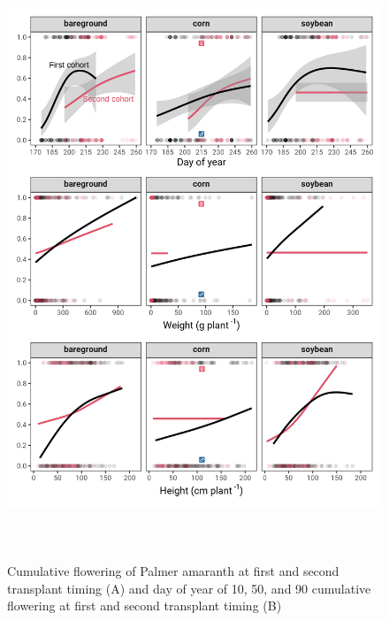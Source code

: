 \documentclass[utf8]{frontiersSCNS}
\begin{document}
\begin{figure}

{\centering \includegraphics[width=120mm,height=180mm]{../data analysis/figures/Figure 4} 

}

\caption{Cumulative flowering of Palmer amaranth at first and second transplant timing (A) and day of year of 10, 50, and 90 cumulative flowering at first and second transplant timing (B)}\label{fig:Figure-5}
\end{figure}
\end{document}
